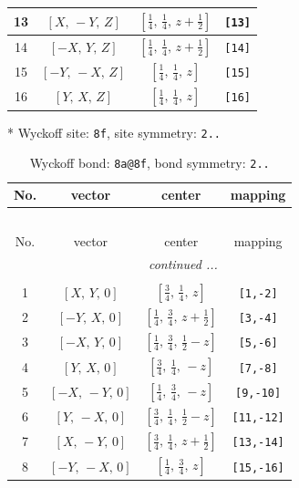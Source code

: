 \documentclass[fleqn,8pt]{jsarticle}
\begin{document}
\begin{longtable}{cccc}
13 & $\left[ X,\, - Y,\, Z \right]$ & $\left[ \frac{1}{4},\, \frac{1}{4},\, z + \frac{1}{2} \right]$ & {\tt [13]} \\ \hline
14 & $\left[ - X,\, Y,\, Z \right]$ & $\left[ \frac{1}{4},\, \frac{1}{4},\, z + \frac{1}{2} \right]$ & {\tt [14]} \\ \hline
15 & $\left[ - Y,\, - X,\, Z \right]$ & $\left[ \frac{1}{4},\, \frac{1}{4},\, z \right]$ & {\tt [15]} \\ \hline
16 & $\left[ Y,\, X,\, Z \right]$ & $\left[ \frac{1}{4},\, \frac{1}{4},\, z \right]$ & {\tt [16]} \\
\end{longtable}
* Wyckoff site: {\tt 8f}, site symmetry: {\tt 2..}
\renewcommand{\arraystretch}{1.2}
\begin{longtable}{cccc}
\caption{Wyckoff bond: {\tt 8a@8f}, bond symmetry: {\tt 2..}}
 \\
 \hline \hline
No. & vector & center & mapping \\ \hline \endfirsthead

\multicolumn{3}{l}{\tablename\ \thetable{}} \\
 \hline \hline
No. & vector & center & mapping \\ \hline \endhead

 \hline \hline
\multicolumn{3}{r}{\footnotesize\it continued ...} \\ \endfoot

 \hline \hline
\multicolumn{3}{r}{} \\ \endlastfoot

1 & $\left[ X,\, Y,\, 0 \right]$ & $\left[ \frac{3}{4},\, \frac{1}{4},\, z \right]$ & {\tt [1,-2]} \\ \hline
2 & $\left[ - Y,\, X,\, 0 \right]$ & $\left[ \frac{1}{4},\, \frac{3}{4},\, z + \frac{1}{2} \right]$ & {\tt [3,-4]} \\ \hline
3 & $\left[ - X,\, Y,\, 0 \right]$ & $\left[ \frac{1}{4},\, \frac{3}{4},\, \frac{1}{2} - z \right]$ & {\tt [5,-6]} \\ \hline
4 & $\left[ Y,\, X,\, 0 \right]$ & $\left[ \frac{3}{4},\, \frac{1}{4},\, - z \right]$ & {\tt [7,-8]} \\ \hline
5 & $\left[ - X,\, - Y,\, 0 \right]$ & $\left[ \frac{1}{4},\, \frac{3}{4},\, - z \right]$ & {\tt [9,-10]} \\ \hline
6 & $\left[ Y,\, - X,\, 0 \right]$ & $\left[ \frac{3}{4},\, \frac{1}{4},\, \frac{1}{2} - z \right]$ & {\tt [11,-12]} \\ \hline
7 & $\left[ X,\, - Y,\, 0 \right]$ & $\left[ \frac{3}{4},\, \frac{1}{4},\, z + \frac{1}{2} \right]$ & {\tt [13,-14]} \\ \hline
8 & $\left[ - Y,\, - X,\, 0 \right]$ & $\left[ \frac{1}{4},\, \frac{3}{4},\, z \right]$ & {\tt [15,-16]} \\
\end{longtable}
\end{document}
